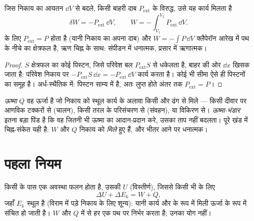 \begin{proposition}[दाब-बलों का कार्य]\label{prop:b1:first-law:work}
जिस निकाय का आयतन $\dd V$ से बदले, किसी बाहरी दाब $P_{\mathrm{ext}}$ के
विरुद्ध, उसे यह कार्य मिलता है
\[
\delta W = -P_{\mathrm{ext}}\,\dd V, \qquad
W = -\int_{V_1}^{V_2}P_{\mathrm{ext}}\,\dd V .
\]
 के लिए $P_{\mathrm{ext}} = P$ होता है (यानी निकाय का
अपना दाब) और $W = -\int P\,\dd V$ क्लैपेरॉन आरेख में पथ के नीचे का
क्षेत्रफल है, ऋण चिह्न के साथ: संपीडन में धनात्मक, प्रसार में ऋणात्मक।
\end{proposition}

\begin{proof}
$S$ क्षेत्रफल का कोई पिस्टन, जिसे परिवेश बल $P_{\mathrm{ext}}S$ से धकेलता
है, बाहर की ओर $\dd x$ खिसक जाता है: परिवेश निकाय पर
$-P_{\mathrm{ext}}S\,\dd x = -P_{\mathrm{ext}}\,\dd V$ कार्य करता है। कोई भी
सीमा ऐसे ही पिस्टनों का समूह है। अर्ध-स्थैतिक में: पिस्टन साम्य में है, अतः
लुप्त होते अंतर तक $P_{\mathrm{ext}} = P$।
\end{proof}

\begin{definition}[ऊष्मा]\label{def:b1:first-law:heat}
\emph{ऊष्मा} $Q$ वह ऊर्जा है जो निकाय को स्थूल कार्य के अलावा किसी और ढंग
से मिले --- किसी दीवार पर आणविक टक्करों से (चालन), किसी तरल के परिसंचरण से
(संवहन), या विकिरण से। \emph{ऊष्मा-भंडार} इतना बड़ा पिंड है कि वह जितनी भी
ऊष्मा का आदान-प्रदान करे, उसका ताप नहीं बदलता। पूरे खंड में चिह्न-संकेत
यही है: $W$ और $Q$ निकाय को \emph{मिले} हुए हैं, और भीतर आने पर धनात्मक।
\end{definition}

\section{पहला नियम}

\begin{theorem}[ऊष्मागतिकी का पहला नियम]\label{thm:b1:first-law:firstlaw}
किसी  के पास एक अवस्था फलन होता है, उसकी \emph{}
$U$ (विस्तीर्ण), जिससे किसी भी  के लिए
\[
\Delta U + \Delta E_{k} = W + Q ,
\]
जहाँ $E_k$ स्थूल  है (विराम में पड़े निकाय के लिए शून्य): यानी
कार्य और  के रूप में मिली ऊर्जा  के रूप में संचित हो
जाती है। $W$ और $Q$ में से हर एक पथ पर निर्भर करता है; उनका योग नहीं।
\end{theorem}
\admitted

